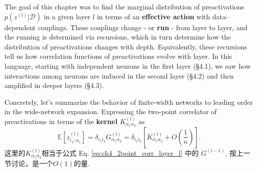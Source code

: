 The goal of this chapter was to find the marginal distribution of preactivations
$p(z^{(l)}\big| \mathcal{D})$ in a given layer $l$ in terms of an \textbf{effective action}
with data-dependent couplings. These couplings change - or \textbf{run} - from layer to 
layer, and the running is determined via recursions, which in turn determine 
how the distribution of preactivations changes with depth. Equivalently, 
these recursions tell us how correlation functions of preactivations evolve with layer. 
In this language, starting with independent neurons in the first layer (§4.1), we saw 
how interactions among neurons are induced in the second layer (§4.2) and 
then amplified in deeper layers (§4.3).

Concretely, let's summarize the behavior of finite-width networks to leading order
in the wide-network expansion. Expressing the two-point correlator of 
preactivations in terms of the \textbf{kernel} $K_{\alpha_1\alpha_2}^{(l)}$ as
\begin{equation}
    \mathbb{E}\left[z_{i_1;\alpha_1}^{(l)}\right] = \delta_{i_1i_2}G_{\alpha_1\alpha_2}^{(l)}
    = \delta_{i_1i_2}\left[K_{\alpha_1\alpha_2}^{(l)} + O\left(\frac{1}{n}\right)\right].
\end{equation}
这里的$K_{\alpha_1\alpha_2}^{(l)}$相当于公式 Eq. \ref{eq:ch4_2point_corr_layer_l} 中的
$G^{(l-1)}$, 按上一节讨论，是一个$O(1)$的量.

